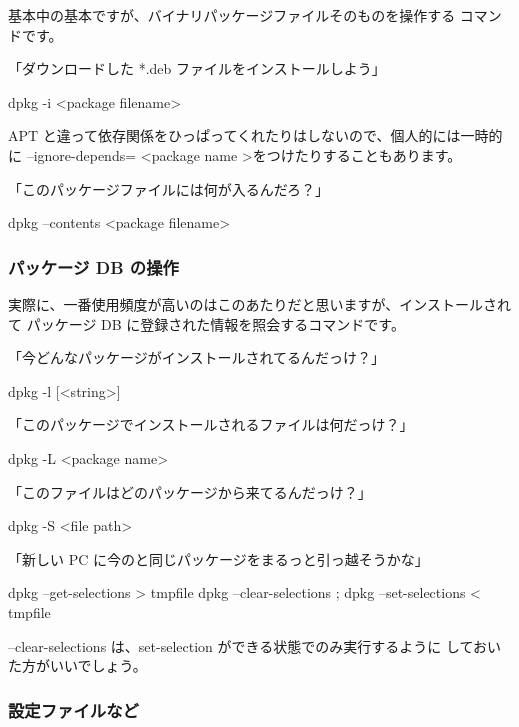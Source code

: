 \documentclass[mingoth,a4paper]{jsarticle}
\begin{document}
基本中の基本ですが、バイナリパッケージファイルそのものを操作する
コマンドです。

「ダウンロードした *.deb ファイルをインストールしよう」
\begin{commandline}
dpkg -i <package filename>
\end{commandline}

APT と違って依存関係をひっぱってくれたりはしないので、個人的には一時的に
--ignore-depends= \textless package name \textgreater をつけたりすることもあります。

「このパッケージファイルには何が入るんだろ？」
\begin{commandline}
dpkg --contents <package filename>
\end{commandline}

\subsubsection{パッケージ DB の操作}

実際に、一番使用頻度が高いのはこのあたりだと思いますが、インストールされて
パッケージ DB に登録された情報を照会するコマンドです。

「今どんなパッケージがインストールされてるんだっけ？」
\begin{commandline}
dpkg -l [<string>]
\end{commandline}

「このパッケージでインストールされるファイルは何だっけ？」
\begin{commandline}
dpkg -L <package name>
\end{commandline}

「このファイルはどのパッケージから来てるんだっけ？」
\begin{commandline}
dpkg -S <file path>
\end{commandline}

「新しい PC に今のと同じパッケージをまるっと引っ越そうかな」
\begin{commandline}
dpkg --get-selections > tmpfile
dpkg --clear-selections ; dpkg --set-selections < tmpfile
\end{commandline}

--clear-selections は、set-selection ができる状態でのみ実行するように
しておいた方がいいでしょう。

\subsubsection{設定ファイルなど}
\end{document}
